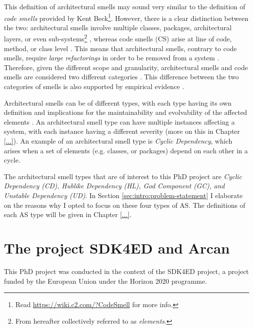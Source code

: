 This definition of architectural smells may sound very similar to the definition of \emph{code smells} provided by Kent Beck\footnote{Read \url{https://wiki.c2.com/?CodeSmell} for more info.}. 
However, there is a clear distinction between the two: architectural smells involve multiple classes, packages, architectural layers, or even sub-systems\footnote{From hereafter collectively referred to as \emph{elements}.} \cite{Lippert2006}, whereas code smells (CS) arise at line of code, method, or class level \cite{Fowler2002}. 
This means that architectural smells, contrary to code smells, require \emph{large refactorings} in order to be removed from a system \cite{Lippert2006}.
Therefore, given the different scope and granularity, architectural smells and code smells are considered two different categories \cite{Sharma2020}.
This difference between the two categories of smells is also supported by empirical evidence \cite{Arcelli2019}.

Architectural smells can be of different types, with each type having its own definition and implications for the maintainability and evolvability of the affected elements \cite{Azadi2019}.
An architectural smell type can have multiple instances affecting a system, with each instance having a different severity (more on this in Chapter \ref{...}).
An example of an architectural smell type is \emph{Cyclic Dependency}, which arises when a set of elements (e.g. classes, or packages) depend on each other in a cycle.

The architectural smell types that are of interest to this PhD project are \emph{Cyclic Dependency (CD), Hublike Dependency (HL), God Component (GC), and Unstable Dependency (UD)}.
In Section \ref{sec:intro:problem-statement} I elaborate on the reasons why I opted to focus on these four types of AS.
The definitions of each AS type will be given in Chapter \ref{...}.


\section{The project SDK4ED and Arcan}
This PhD project was conducted in the context of the SDK4ED project, a project funded by the European Union under the Horizon 2020 programme.


